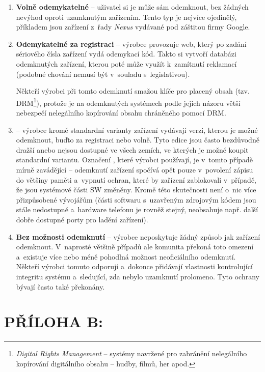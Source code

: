 \documentclass[12pt, a4paper, oneside]{article}
\newcommand{\B}{\textbf} %
\newcommand{\It}{\textit}  %
\begin{document}
\begin{enumerate}
    \item \B{Volně odemykatelné} -- uživatel si je může sám odemknout, bez žádných nevýhod oproti uzamknutým zařízením. Tento typ je nejvíce ojedinělý, příkladem jsou zařízení z~řady \It{Nexus} vydávané pod záštitou firmy Google.
    
    \item \B{Odemykatelné za registraci} -- výrobce provozuje web, který po zadání sériového čísla zařízení vydá odemykací kód. Takto si vytvoří databázi odemknutých zařízení, kterou poté může využít k~zamítnutí reklamací (podobné chování nemusí být v~souladu s~legislativou).
    
    Někteří výrobci při tomto odemknutí smažou klíče pro placený obsah (tzv. DRM\footnote{\It{Digital Rights Management} -- systémy navržené pro zabránění nelegálního kopírování digitálního obsahu -- hudby, filmů, her apod.}), protože je na odemknutých systémech podle jejich názoru větší nebezpečí nelegálního kopírování obsahu chráněného pomocí DRM.
    
    \item \B{} -- výrobce kromě standardní varianty zařízení vydávají verzi, kterou je možné odemknout, buďto za registraci nebo volně. Tyto edice jsou často bezdůvodně dražší anebo nejsou dostupné ve všech zemích, ve kterých je možné koupit standardní variantu. Označení , které výrobci používají, je v~tomto případě mírně zavádějící -- odemknutí zařízení spočívá opět pouze v~povolení zápisu do většiny paměti a~vypnutí ochran, které by zařízení zablokovali v~případě, že jsou systémové části SW změněny. Kromě této skutečnosti není o~nic více přizpůsobené vývojářům (části softwaru s~uzavřeným zdrojovým kódem jsou stále nedostupné a~hardware telefonu je rovněž stejný, neobsahuje např. další dobře dostupné porty pro ladění zařízení).

    \item \B{Bez možnosti odemknutí} -- výrobce neposkytuje žádný způsob jak zařízení odemknout. V~naprosté většině případů ale komunita překoná toto omezení a~existuje více nebo méně pohodlná možnost neoficiálního odemknutí. Někteří výrobci tomuto odporují a~dokonce přidávají vlastnosti kontrolující integritu systému a~sledující, zda nebylo uzamknutí prolomeno. Tyto ochrany bývají často také překonány.
    
\end{enumerate}

\newpage
\section*{PŘÍLOHA B:}
\end{document}
